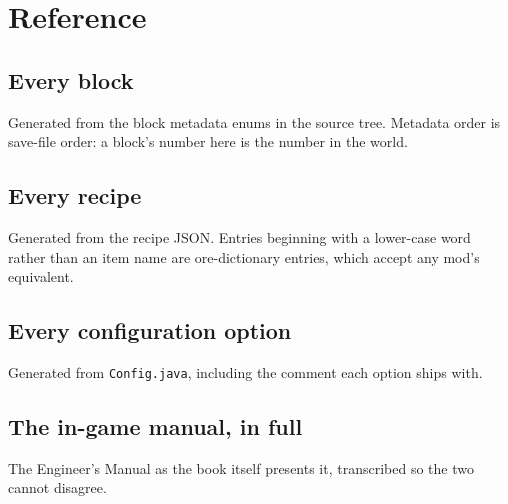 \documentclass[11pt,openany]{report}
\begin{document}
\part{Reference}

\chapter{Every block}
\label{ch:blocks}
Generated from the block metadata enums in the source tree. Metadata order is save-file order:
a block's number here is the number in the world.


\chapter{Every recipe}
\label{ch:recipes}
Generated from the recipe JSON. Entries beginning with a lower-case word rather than an item name
are ore-dictionary entries, which accept any mod's equivalent.


\chapter{Every configuration option}
\label{ch:config}
Generated from \texttt{Config.java}, including the comment each option ships with.


\chapter{The in-game manual, in full}
\label{ch:ingame}
The Engineer's Manual as the book itself presents it, transcribed so the two cannot disagree.

\end{document}
